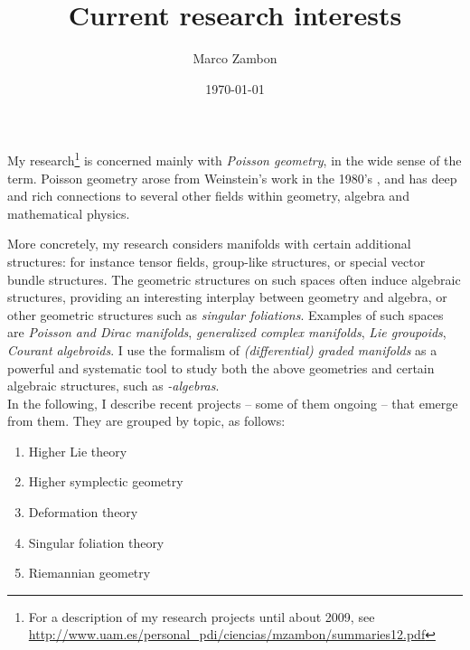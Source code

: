 \documentclass[11pt]{amsart}
\begin{document}
\newtheorem{Thm}{Theorem}[section]
\newtheorem{Prop}[Thm]{Proposition}
\newtheorem{Lemma}[Thm]{Lemma}
\newtheorem{Cor}[Thm]{Corollary}
\newtheorem{Claim}[Thm]{Claim}
\newtheorem{Fact}[Thm]{Fact}
\theoremstyle{definition}
\newtheorem{Def}[Thm]{Definition}
\newtheorem{Ex}[Thm]{Example}
\newtheorem{Exs}[Thm]{Examples}
\theoremstyle{remark}
\newtheorem{Remark}[Thm]{Remark}
\title{Current  research interests}
\author{Marco Zambon}
\date{\today}
\maketitle
 
My research\footnote{
For a description of my research projects until about 2009, see
\url{http://www.uam.es/personal_pdi/ciencias/mzambon/summaries12.pdf}} 
  is  concerned  mainly with 
\emph{Poisson geometry}, in the wide sense of the term. Poisson geometry arose from Weinstein's work in the 1980's \cite{We},
and has  deep and rich connections to several other fields within geometry, algebra and mathematical physics.  

More concretely, my research considers manifolds with certain additional structures: for instance  tensor fields, group-like structures, or special vector  bundle structures. The geometric structures on such spaces often induce algebraic structures, providing an interesting interplay between geometry  and algebra, or other geometric structures such as \emph{singular foliations}.  Examples of such spaces are    \emph{Poisson and Dirac manifolds},  
\emph{generalized complex manifolds}, \emph{Lie groupoids}, \emph{Courant algebroids}.
I use the formalism of
\emph{(differential) graded manifolds} as a powerful and systematic tool to study both the above geometries and certain algebraic structures, such as \emph{\li-algebras}.\\

In the following, I describe recent projects -- some of them ongoing --  that emerge from them. They
are grouped by topic, as follows:
\begin{enumerate}
\item  Higher Lie theory
\item Higher symplectic geometry
\item Deformation theory 
\item Singular foliation theory 
\item Riemannian geometry
\end{enumerate}
\end{document}
